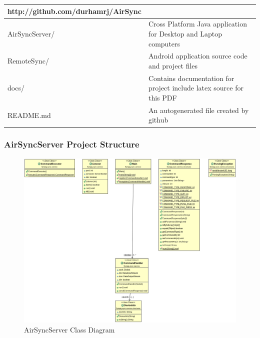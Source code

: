 \documentclass[12pt]{article}
\begin{document}
\begin{center}
\begin{tabular}{|l|p{7.5cm}|}
\hline
	\textbf{http://github.com/durhamrj/AirSync} \\
\hline
	AirSyncServer/ 
	& Cross Platform Java application for Desktop and Laptop computers\\
\hline 
	RemoteSync/
	& Android application source code and project files\\
\hline
	docs/
	& Contains documentation for project include latex source for this PDF\\
\hline
	README.md
	& An autogenerated file created by github\\
\hline
\end{tabular}
\end{center}

\subsubsection{AirSyncServer Project Structure}

\begin{figure}[H]
\center
\includegraphics[width=1\textwidth]{class-diag.png}
\caption{AirSyncServer Class Diagram}
\end{figure}
\end{document}

